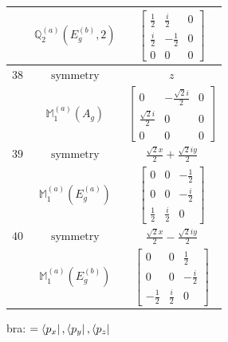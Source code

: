 \documentclass[fleqn,8pt,landscape]{jsarticle}
\begin{document}
\begin{longtable}{ccc}
$  $ & $ \mathbb{Q}_{2}^{(a)}(E_{g}^{(b)},2) $ & $ \begin{bmatrix} \frac{1}{2} & \frac{i}{2} & 0 \\ \frac{i}{2} & - \frac{1}{2} & 0 \\ 0 & 0 & 0 \end{bmatrix} $ \\ \hline
$ 38 $ & $ \text{symmetry} $ & $ z $ \\
$  $ & $ \mathbb{M}_{1}^{(a)}(A_{g}) $ & $ \begin{bmatrix} 0 & - \frac{\sqrt{2} i}{2} & 0 \\ \frac{\sqrt{2} i}{2} & 0 & 0 \\ 0 & 0 & 0 \end{bmatrix} $ \\ \hline
$ 39 $ & $ \text{symmetry} $ & $ \frac{\sqrt{2} x}{2} + \frac{\sqrt{2} i y}{2} $ \\
$  $ & $ \mathbb{M}_{1}^{(a)}(E_{g}^{(a)}) $ & $ \begin{bmatrix} 0 & 0 & - \frac{1}{2} \\ 0 & 0 & - \frac{i}{2} \\ \frac{1}{2} & \frac{i}{2} & 0 \end{bmatrix} $ \\ \hline
$ 40 $ & $ \text{symmetry} $ & $ \frac{\sqrt{2} x}{2} - \frac{\sqrt{2} i y}{2} $ \\
$  $ & $ \mathbb{M}_{1}^{(a)}(E_{g}^{(b)}) $ & $ \begin{bmatrix} 0 & 0 & \frac{1}{2} \\ 0 & 0 & - \frac{i}{2} \\ - \frac{1}{2} & \frac{i}{2} & 0 \end{bmatrix} $ \\ \hline
\end{longtable}
bra: $=\bra{p_{x}}, \bra{p_{y}}, \bra{p_{z}}$
\end{document}
